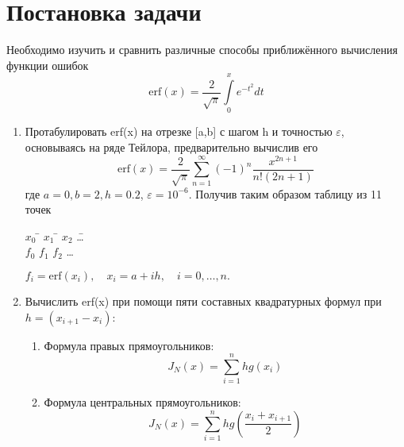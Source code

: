 \documentclass[14pt]{article}
\begin{document}
\newpage
\begin{center}
\renewcommand{\contentsname}{Содержание}
\tableofcontents
\newpage
\end{center}
\newpage
\section{Постановка задачи}
\hspace{5mm}Необходимо изучить и сравнить различные способы приближённого вычисления функции ошибок
\begin{equation}
    \text{erf}(x) =\displaystyle\frac{2}{\sqrt{\pi}} \displaystyle\int\limits_{0}^{x} e^{-t^2} dt
\end{equation}
\begin{enumerate}
    \item Протабулировать erf(x) на отрезке [a,b] с шагом h и точностью $ \varepsilon$, основываясь на ряде Тейлора,
     предварительно вычислив его
     \begin{equation}
        \text{erf}(x) =\displaystyle\frac{2}{\sqrt{\pi}} \displaystyle\sum\limits_{n=1}^{\infty}(-1)^n\displaystyle\frac{x^{2n+1}}{n!(2n+1)}
     \end{equation}
    где $a = 0, b = 2, h = 0.2$, $\varepsilon = 10^{-6}$. Получив таким образом таблицу из 11 точек
    \begin{tabbing}
        $x_0$ \= $x_1$ \= $x_2$ \= \dots\\
        $f_0$ \> $f_1$ \> $f_2$ \> \dots\\
    \end{tabbing}
    $f_i = \text{erf}(x_i), \quad x_i = a + i   h, \quad i = 0,\dots,n.$
    \item {Вычислить erf(x) при помощи пяти составных квадратурных формул при $h=(x_{i+1} - x_i)$:
        \begin{enumerate}
            \item {
                Формула правых прямоугольников:
                \begin{equation}
                    J_N(x) = \displaystyle\sum_{i=1}^{n}h g(x_i)
                \end{equation}
                }
            \item {
                Формула центральных прямоугольников:
                \begin{equation}
                    J_N(x) = \displaystyle\sum_{i=1}^{n}h g\left(\displaystyle\frac{x_i + x_{i+1}}{2}\right) 
                \end{equation}
}
\end{enumerate}}
\end{enumerate}
\end{document}
